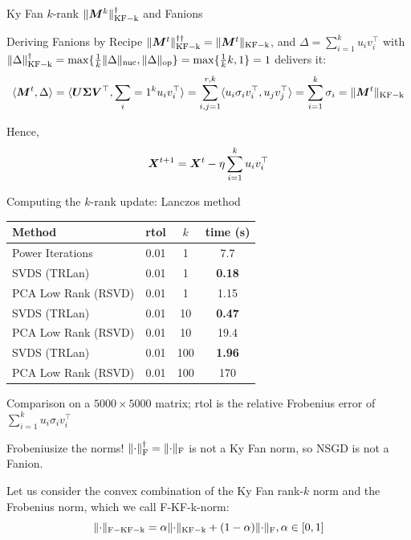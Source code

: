 \documentclass[aspectratio=169]{beamer}
\newcommand{\norm}[1]{\lVert #1\rVert}
\DeclarePairedDelimiter{\normf}{\|}{\|_\mathrm{F}}
\DeclarePairedDelimiter{\normkfk}{\|}{\|_\mathrm{KF-k}}
\DeclarePairedDelimiter{\norms}{\|}{\|_{\mathrm{op}}}
\DeclarePairedDelimiter{\normn}{\|}{\|_{\mathrm{nuc}}}
\def\<#1,#2>{\langle #1,#2\rangle}
\begin{document}
\begin{frame}{Ky Fan $k$-rank $\normkfk{\mM^k}^\dagger$ and Fanions}

\begin{block}{Deriving Fanions by Recipe} $\normkfk{\mM^t}^{\dagger\dagger} = \normkfk{\mM^t}$, and $\Delta = \sum_{i=1}^k{u_i v_i^\top}$ with $\normkfk{\Delta}^\dagger = \max\{\frac{1}{k} \normn{\Delta}, \norms{\Delta}\} = \max\{\frac{1}{k} k, 1\} = 1$ delivers it:
    $$\<\mM^t, \Delta> =\<\mU \mSigma \mV^\top, \sum_{i=1}^{k} u_i v_i^\top> = \sum_{i,j=1}^{r, k}\<u_i \sigma_i v_i^\top, u_j v_j^\top> = \sum_{i=1}^{k}\sigma_i = \normkfk{\mM^t}$$
    
    Hence,
    $${\bm{X}}^{t+1} = {\bm{X}}^{t} - \eta \sum_{i=1}^{k} u_i v_i^\top$$
    \end{block}
\end{frame}
\begin{frame}{Computing the $k$-rank update: Lanczos method}
    \begin{center}
    \small
    \begin{tabular}{lccc}
      \toprule
      Method & rtol & $k$ & time (s) \\
      \midrule
      Power Iterations & 0.01 & 1 & 7.7 \\
      SVDS (TRLan) & 0.01 & 1 & \textbf{0.18} \\
      PCA Low Rank (RSVD) & 0.01 & 1 & 1.15 \\
      SVDS (TRLan) & 0.01 & 10 & \textbf{0.47} \\
      PCA Low Rank (RSVD) & 0.01 & 10 & 19.4 \\
      SVDS (TRLan) & 0.01 & 100 & \textbf{1.96} \\
      PCA Low Rank (RSVD) & 0.01 & 100 & 170 \\
      \bottomrule
    \end{tabular}
    \end{center}
    \vspace{0.4em}
    \centering
    \footnotesize Comparison on a \(5000\times5000\) matrix; rtol is the relative Frobenius error of $\sum_{i=1}^{k}u_i \sigma_i v_i^\top$
  \end{frame}
\begin{frame}{Frobeniusize the norms!}
\faExclamationCircle \space $\normf{\cdot}^\dagger = \normf{\cdot}$ is not a Ky Fan norm, so NSGD is not a Fanion.
\vspace{1em}

Let us consider the convex combination of the Ky Fan rank-$k$ norm and the Frobenius norm, which we call F-KF-k-norm: $$\norm{\cdot}_{\mathrm{F-KF-k}} = \alpha \normkfk{\cdot} + (1-\alpha)\normf{\cdot}, \alpha \in [0,1]$$

\end{frame}
\end{document}
